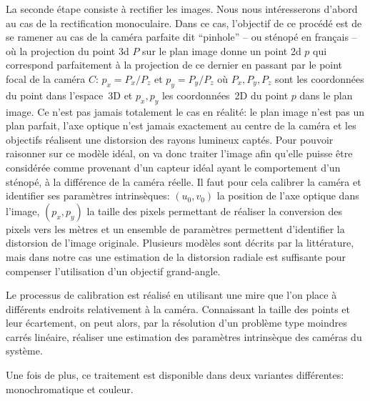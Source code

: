 La seconde étape consiste à rectifier les images. Nous nous
intéresserons d'abord au cas de la rectification
monoculaire. Dans ce cas, l'objectif de ce procédé est de se ramener
au cas de la caméra parfaite dit
``pinhole'' -- ou sténopé en français -- où la projection
du point 3d $P$ sur le plan image donne un point 2d $p$ qui correspond
parfaitement à la projection de ce dernier en passant par le point
focal de la caméra $C$: $p_x = P_x / P_z$ et $p_y = P_y / P_z$ où
$P_x, P_y, P_z$ sont les coordonnées du point dans l'espace 3D et
$p_x, p_y$ les coordonnées 2D du point $p$ dans le plan image. Ce
n'est pas jamais totalement le cas en réalité: le plan image n'est pas
un plan parfait, l'axe optique n'est jamais exactement au centre de la
caméra et les objectifs réalisent une distorsion des
rayons lumineux captés. Pour pouvoir raisonner sur ce modèle idéal, on
va donc traiter l'image afin qu'elle puisse être considérée comme
provenant d'un capteur idéal ayant le comportement d'un sténopé, à la
différence de la caméra réelle. Il faut pour cela calibrer la caméra
et identifier ses paramètres intrinsèques: $(u_0, v_0)$ la position de l'axe optique
dans l'image, $(p_x, p_y)$ la taille des pixels permettant de réaliser
la conversion des pixels vers les mètres et un ensemble de paramètres
permettent d'identifier la distorsion de l'image originale. Plusieurs
modèles sont décrits par la littérature, mais dans notre cas une
estimation de la distorsion radiale est
suffisante pour compenser l'utilisation d'un objectif grand-angle.


Le processus de calibration est réalisé en utilisant une mire que l'on
place à différents endroits relativement à la caméra. Connaissant la
taille des points et leur écartement, on peut alors, par la résolution
d'un problème type moindres carrés linéaire, réaliser une estimation
des paramètres intrinsèque des caméras du système.

Une fois de plus, ce traitement est disponible dans deux variantes
différentes: monochromatique et couleur.

